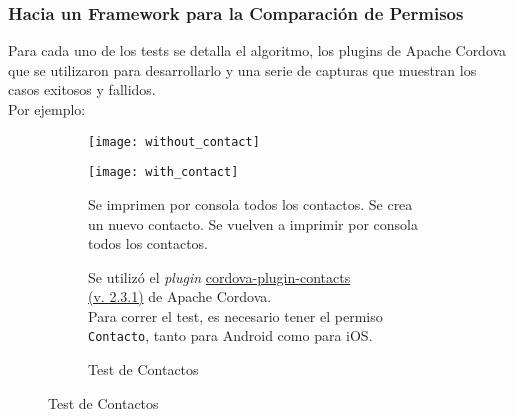 \begin{frame}
 \frametitle{Hacia un Framework para la Comparación de Permisos}
Para cada uno de los tests se detalla el algoritmo, los plugins de Apache Cordova que se utilizaron para desarrollarlo y una serie de capturas que muestran los casos exitosos y fallidos.\\ \pause
Por ejemplo:
\begin{figure}[hbp]
    \centering
    \begin{subfigure}{0.28\linewidth}
        \texttt{[image: without\_contact]}
    \end{subfigure}
    \begin{subfigure}{0.28\linewidth}
        \texttt{[image: with\_contact]}
     \end{subfigure}
	\begin{subfigure}{.40\linewidth}
	\begin{algorithm}[H]
    \scriptsize
	\begin{algorithmic}[1]
		\STATE Se imprimen por consola todos los contactos.
		\STATE Se crea un nuevo contacto.
		\STATE Se vuelven a imprimir por consola todos los contactos.
	\end{algorithmic}
	\caption{\centering Test de Contactos}
   \end{algorithm}
   \begin{block}{}\tiny
 {Se utilizó el \textit{plugin} \href{https://www.npmjs.com/package/cordova-plugin-contacts}{cordova-plugin-contacts \\(v. 2.3.1)} de Apache Cordova.\\Para correr el test, es necesario tener el permiso \texttt{Contacto}, tanto para Android como para iOS.}
   \end{block}
   \end{subfigure}
    \end{figure}
\end{frame}
